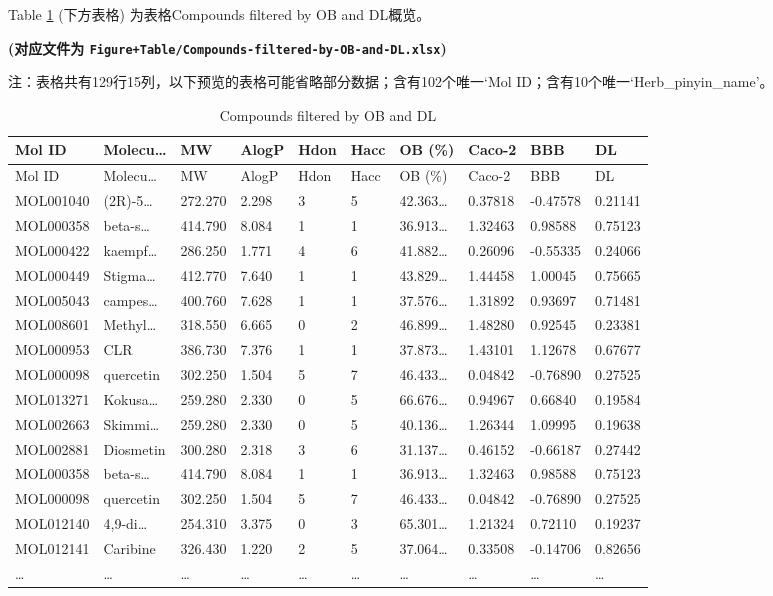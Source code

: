 \documentclass[
]{article}
\begin{document}
Table \ref{tab:Compounds-filtered-by-OB-and-DL} (下方表格) 为表格Compounds filtered by OB and DL概览。

\textbf{(对应文件为 \texttt{Figure+Table/Compounds-filtered-by-OB-and-DL.xlsx})}

\begin{center}\begin{tcolorbox}[colback=gray!10, colframe=gray!50, width=0.9\linewidth, arc=1mm, boxrule=0.5pt]注：表格共有129行15列，以下预览的表格可能省略部分数据；含有102个唯一`Mol ID；含有10个唯一`Herb\_pinyin\_name'。
\end{tcolorbox}
\end{center}

\begin{longtable}[]{@{}llllllllll@{}}
\caption{\label{tab:Compounds-filtered-by-OB-and-DL}Compounds filtered by OB and DL}\tabularnewline
\toprule
Mol ID & Molecu\ldots{} & MW & AlogP & Hdon & Hacc & OB (\%) & Caco-2 & BBB & DL\tabularnewline
\midrule
\endfirsthead
\toprule
Mol ID & Molecu\ldots{} & MW & AlogP & Hdon & Hacc & OB (\%) & Caco-2 & BBB & DL\tabularnewline
\midrule
\endhead
MOL001040 & (2R)-5\ldots{} & 272.270 & 2.298 & 3 & 5 & 42.363\ldots{} & 0.37818 & -0.47578 & 0.21141\tabularnewline
MOL000358 & beta-s\ldots{} & 414.790 & 8.084 & 1 & 1 & 36.913\ldots{} & 1.32463 & 0.98588 & 0.75123\tabularnewline
MOL000422 & kaempf\ldots{} & 286.250 & 1.771 & 4 & 6 & 41.882\ldots{} & 0.26096 & -0.55335 & 0.24066\tabularnewline
MOL000449 & Stigma\ldots{} & 412.770 & 7.640 & 1 & 1 & 43.829\ldots{} & 1.44458 & 1.00045 & 0.75665\tabularnewline
MOL005043 & campes\ldots{} & 400.760 & 7.628 & 1 & 1 & 37.576\ldots{} & 1.31892 & 0.93697 & 0.71481\tabularnewline
MOL008601 & Methyl\ldots{} & 318.550 & 6.665 & 0 & 2 & 46.899\ldots{} & 1.48280 & 0.92545 & 0.23381\tabularnewline
MOL000953 & CLR & 386.730 & 7.376 & 1 & 1 & 37.873\ldots{} & 1.43101 & 1.12678 & 0.67677\tabularnewline
MOL000098 & quercetin & 302.250 & 1.504 & 5 & 7 & 46.433\ldots{} & 0.04842 & -0.76890 & 0.27525\tabularnewline
MOL013271 & Kokusa\ldots{} & 259.280 & 2.330 & 0 & 5 & 66.676\ldots{} & 0.94967 & 0.66840 & 0.19584\tabularnewline
MOL002663 & Skimmi\ldots{} & 259.280 & 2.330 & 0 & 5 & 40.136\ldots{} & 1.26344 & 1.09995 & 0.19638\tabularnewline
MOL002881 & Diosmetin & 300.280 & 2.318 & 3 & 6 & 31.137\ldots{} & 0.46152 & -0.66187 & 0.27442\tabularnewline
MOL000358 & beta-s\ldots{} & 414.790 & 8.084 & 1 & 1 & 36.913\ldots{} & 1.32463 & 0.98588 & 0.75123\tabularnewline
MOL000098 & quercetin & 302.250 & 1.504 & 5 & 7 & 46.433\ldots{} & 0.04842 & -0.76890 & 0.27525\tabularnewline
MOL012140 & 4,9-di\ldots{} & 254.310 & 3.375 & 0 & 3 & 65.301\ldots{} & 1.21324 & 0.72110 & 0.19237\tabularnewline
MOL012141 & Caribine & 326.430 & 1.220 & 2 & 5 & 37.064\ldots{} & 0.33508 & -0.14706 & 0.82656\tabularnewline
\ldots{} & \ldots{} & \ldots{} & \ldots{} & \ldots{} & \ldots{} & \ldots{} & \ldots{} & \ldots{} & \ldots{}\tabularnewline
\bottomrule
\end{longtable}
\end{document}
